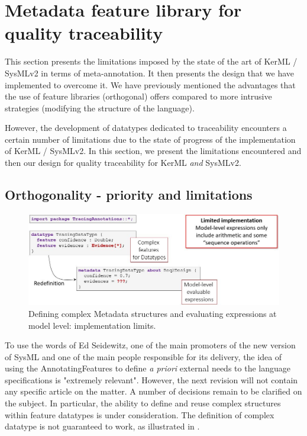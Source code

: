 \section{Metadata feature library for quality traceability}\label{sec:extension}

This section presents the limitations imposed by the state of the art of KerML / SysMLv2 in terms of meta-annotation. It then presents the design that we have implemented to overcome it.
\sideboxend
We have previously mentioned the advantages that the use of feature libraries  (orthogonal) offers compared to more intrusive strategies (modifying the structure of the language).

However, the development of datatypes dedicated to traceability encounters a certain number of limitations due to the state of progress of the implementation of KerML / SysMLv2. In this section, we present the limitations encountered and then our design for quality traceability for KerML \textit{and} SysMLv2.

\subsection{Orthogonality - priority and limitations}\label{sec:orthogonalite}
 
\begin{figure}[ht]     
	\centering
	\includegraphics[width=.99\linewidth]{images/strategy4-metadatatype.jpg}
	\caption{Defining complex Metadata structures and evaluating expressions at model level: implementation limits. }
	\label{fig:strategy4}
\end{figure}


To use the words of Ed Seidewitz, one of the main promoters of the new version of SysML and one of the main people responsible for its delivery, the idea of using the AnnotatingFeatures to define \textit{a priori} external needs to the language specifications is "extremely relevant". However, the next revision will not contain any specific article on the matter. A number of decisions remain to be clarified on the subject.
In particular, the ability to define and reuse complex structures within feature datatypes is under consideration. The definition of complex datatype is not guaranteed to work, as illustrated in .

